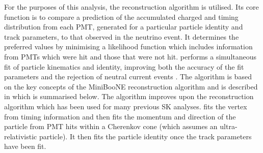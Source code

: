 
For the purposes of this analysis, the \fq reconstruction algorithm is utilised. Its core function is to compare a prediction of the accumulated charged and timing distribution from each PMT, generated for a particular particle identity and track parameters, to that observed in the neutrino event. It determines the preferred values by minimising a likelihood function which includes information from PMTs which were hit and those that were not hit. \fq performs a simultaneous fit of particle kinematics and identity, improving both the accuracy of the fit parameters and the rejection of neutral current  events \cite{Abe2018, Abe2015}. The \fq algorithm is based on the key concepts of the MiniBooNE reconstruction algorithm \cite{Patterson_2009} and is described in \cite{t2k_tn_146} which is summarised below. The \fq algorithm improves upon the \apfit reconstruction algorithm which has been used for many previous SK analyses. \apfit fits the vertex from timing information and then fits the momentum and direction of the particle from PMT hits within a \quickmath{43\deg} Cherenkov cone (which assumes an ultra-relativistic particle). It then fits the particle identity once the track parameters have been fit.

